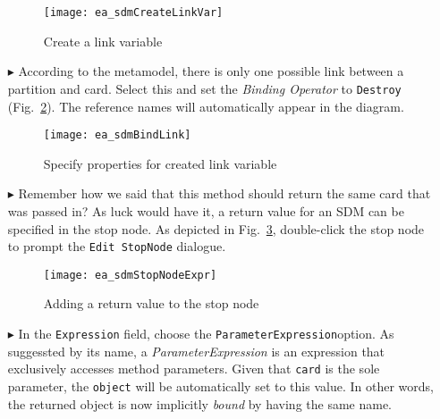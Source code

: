 \begin{itemize}
\begin{figure}[htpb]
\begin{center}
  \texttt{[image: ea\_sdmCreateLinkVar]}
  \caption{Create a link variable}   
  \label{fig:link_variable}
\end{center}
\end{figure}

\item[$\blacktriangleright$] According to the metamodel, there is only one possible link between a partition and card. Select this and set the
\emph{Binding Operator} to \texttt{Destroy} (Fig.~\ref{fig:link_variable_properties}). The reference names will automatically appear in the diagram.

\vspace{0.5cm}

\begin{figure}[h!]
\begin{center} 
 \texttt{[image: ea\_sdmBindLink]}
  \caption{Specify properties for created link variable}  
  \label{fig:link_variable_properties}
\end{center}
\end{figure}

\vspace{0.5cm}

\item[$\blacktriangleright$] Remember how we said that this method should return the same card that was passed in? As luck would have it, a return value for an
SDM can be specified in the stop node. As depicted in Fig.~\ref{fig:stop_node_return_value}, double-click the stop node to prompt the \texttt{Edit StopNode} dialogue. 

\newpage

\begin{figure}[htbp]
\begin{center}
  \texttt{[image: ea\_sdmStopNodeExpr]}
  \caption{Adding a return value to the stop node}  
  \label{fig:stop_node_return_value}
\end{center}
\end{figure}

\item[$\blacktriangleright$] In the \texttt{Expression} field, choose the \texttt{ParameterExpression}option.
As suggessted by its name, a \emph{ParameterExpression} is an expression that exclusively accesses method parameters. Given that \texttt{card} is the sole
parameter, the \texttt{object} will be automatically set to this value. In other words, the returned object is now implicitly \emph{bound} by having the same
name.


\end{itemize}
